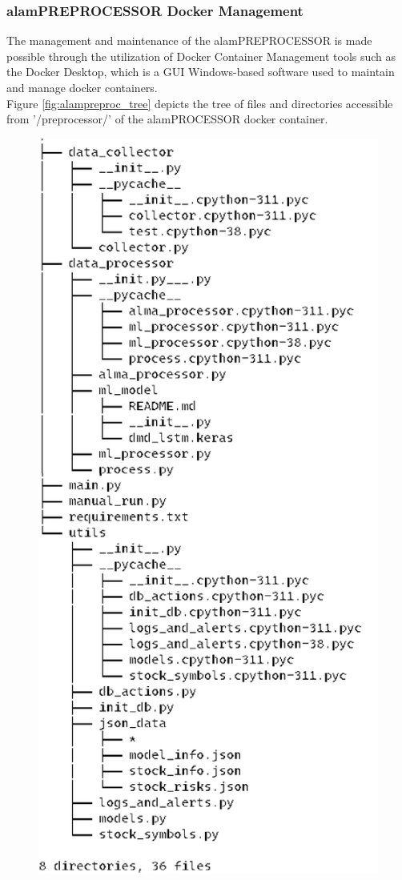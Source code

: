 \subsubsection{alamPREPROCESSOR Docker Management}
\label{subsubsec:alamPREPROCESSOR_docker_management}
The management and maintenance of the alamPREPROCESSOR is made possible
through the utilization of Docker Container Management tools
such as the Docker Desktop, which is a GUI Windows-based software
used to maintain and manage docker containers.
\\

Figure \ref{fig:alampreproc_tree} depicts the tree of files and directories accessible 
from '/preprocessor/' of the alamPROCESSOR docker container.
\begin{figure}[ht]
    \centering
    \includegraphics[height=0.85\textheight]{./assets/Chapter_4/Documentation/alampre_tree.png}

\end{figure}
